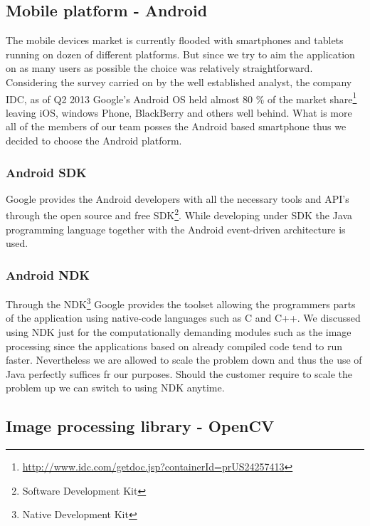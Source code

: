 \subsection{Mobile platform - Android} \label{txt:mobile_platform}

The mobile devices market is currently flooded with smartphones and tablets running on dozen of different platforms. 
But since we try to aim the application on as many users as possible the choice was relatively straightforward.
Considering the survey carried on by the well established analyst, the company IDC, as of Q2 2013 Google's Android OS held almost 80 \% of the market share\footnote{\url{http://www.idc.com/getdoc.jsp?containerId=prUS24257413}} leaving iOS, windows Phone, BlackBerry and others well behind.
What is more all of the members of our team posses the Android based smartphone thus we decided to choose the Android platform.

\subsubsection{Android SDK}

Google provides the Android developers with all the necessary tools and API's through the open source and free SDK\footnote{Software Development Kit}. While developing under SDK the Java programming language together with the Android event-driven architecture is used.

\subsubsection{Android NDK}

Through the NDK\footnote{Native Development Kit} Google provides the toolset allowing the programmers parts of the application using native-code languages such as C and C++.
We discussed using NDK just for the computationally demanding modules such as the image processing since the applications based on already compiled code tend to run faster.
Nevertheless we are allowed to scale the problem down and thus the use of Java perfectly suffices fr our purposes.
Should the customer require to scale the problem up we can switch to using NDK anytime.

\subsection{Image processing library - OpenCV} \label{txt:image_processing_library}

